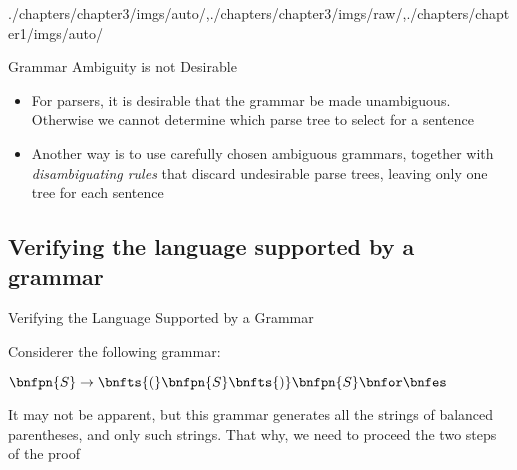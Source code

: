 \begin{graphicspathcontext}{{./chapters/chapter3/imgs/auto/},{./chapters/chapter3/imgs/raw/},{./chapters/chapter1/imgs/auto/}}
\begin{bibunit}[apalike]
\begin{frame}[background=6]{Grammar Ambiguity is not Desirable}
	\begin{itemize}
	\item For parsers, it is desirable that the grammar be made unambiguous. Otherwise we cannot determine which parse tree to select for a sentence
	\vfill
	\item Another way is to use carefully chosen ambiguous grammars, together with \emph{disambiguating rules} that discard undesirable parse trees, leaving only one tree for each sentence
	\end{itemize}
\end{frame}

\subsection{Verifying the language supported by a grammar}
\subsectiontableofcontentslide

\begin{frame}[t]{Verifying the Language Supported by a Grammar}
	\begin{example}
		\begin{small}
		Considerer the following grammar:
		\begin{center}$\bnfpn{S} \bnfopo \bnfts{(} \bnfpn{S} \bnfts{)} \bnfpn{S} \bnfor \bnfes$\end{center}
		It may not be apparent, but this grammar generates all the strings of balanced parentheses, and only such strings.  That why, we need to proceed the two steps of the proof
		\end{small}
	\end{example}
\end{frame}


\end{bibunit}
\end{graphicspathcontext}
